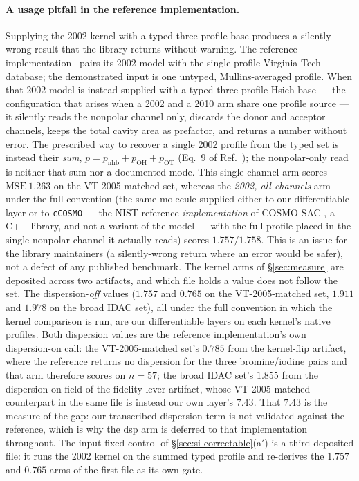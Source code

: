 \paragraph{A usage pitfall in the reference implementation.} Supplying the 2002
kernel with a typed three-profile base produces a silently-wrong result that the library returns without
warning. The reference implementation~\cite{bell2020cosmosac} pairs its 2002 model
with the single-profile Virginia Tech database; the demonstrated input is one
untyped, Mullins-averaged profile. When that 2002 model is instead supplied with a typed three-profile
Hsieh base --- the configuration that arises when a 2002 and a 2010 arm share one
profile source --- it silently reads the nonpolar channel only, discards the donor and acceptor channels, keeps the
total cavity area as prefactor, and returns a number without error. The prescribed way to recover a
single 2002 profile from the typed set is instead their \emph{sum},
$p=p_{\mathrm{nhb}}+p_{\mathrm{OH}}+p_{\mathrm{OT}}$ (Eq.~9 of Ref.~\cite{bell2020cosmosac}); the
nonpolar-only read is neither that sum nor a documented mode. This single-channel arm scores
$\mathrm{MSE}\ 1.263$ on the VT-2005-matched set, whereas the \emph{2002, all channels} arm under the full convention (the same molecule supplied
either to our differentiable layer or to \texttt{cCOSMO} --- the NIST reference \emph{implementation}
of COSMO-SAC \cite{bell2020cosmosac}, a C++ library, and not a variant of the model ---
with the full profile placed in the single
nonpolar channel it actually reads) scores $1.757/1.758$. This is an issue for the library maintainers
(a silently-wrong return where an error would be safer), not a defect of any published benchmark.
The kernel arms of \S\ref{sec:measure} are deposited across two artifacts, and which file holds a
value does not follow the set. The dispersion-\emph{off} values ($1.757$ and $0.765$ on the VT-2005-matched set, $1.911$ and $1.978$ on
the broad IDAC set), all under the full convention in which the kernel comparison is run, are our
differentiable layers on each kernel's native profiles.
Both dispersion values are the reference implementation's own
dispersion-on call: the VT-2005-matched set's $0.785$ from the kernel-flip artifact, where the reference
returns no dispersion for the three bromine/iodine pairs and that arm therefore scores on $n{=}57$;
the broad IDAC set's $1.855$ from the dispersion-on field of
the fidelity-lever artifact, whose VT-2005-matched counterpart in the same file is instead our own
layer's $7.43$. That $7.43$ is the measure of the gap: our transcribed dispersion term is not
validated against the reference, which is why the dsp arm is deferred to that implementation throughout.
The input-fixed control of \S\ref{sec:si-correctable}(a$'$) is a third deposited file: it runs the 2002 kernel on the summed typed
profile and re-derives the $1.757$ and $0.765$ arms of the first file as its own gate.
